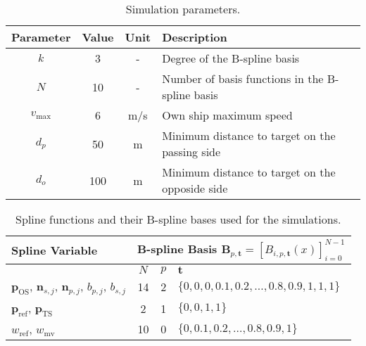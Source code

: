 \renewcommand{\arraystretch}{1.2}
\begin{table}[htbp]
    \centering
    \caption{Simulation parameters.}
    \label{tab:simulation-parameters}
    \begin{tabular}{|c|c|c|p{7cm}|}
        \hline
        \textbf{Parameter} & \textbf{Value} & \textbf{Unit} & \textbf{Description} \\
        \hline
        \rule{0pt}{2.5ex}$k$ & 3 & - & Degree of the B-spline basis \\
        \hline
        \rule{0pt}{2.5ex}$N$ & 10 & - & Number of basis functions in the B-spline basis \\
        \hline
        \rule{0pt}{2.5ex}$v_\text{max}$ & 6 & m/s & Own ship maximum speed \\
        \hline
        \rule{0pt}{2.5ex}$d_p$ & 50 & m & Minimum distance to target on the passing side \\
        \hline
        \rule{0pt}{2.5ex}$d_o$ & 100 & m & Minimum distance to target on the opposide side \\
        \hline
    \end{tabular}
\end{table}
\renewcommand{\arraystretch}{1.0}

\renewcommand{\arraystretch}{1.2}
\begin{table}[htbp]
    \centering
    \caption{Spline functions and their B-spline bases used for the simulations.}\label{tab:sim-spline-basis}
    \begin{tabular}{|p{2.5cm}||c|c|l|}
        \hline
        \rule{0pt}{2.5ex}
        \textbf{Spline Variable} & \multicolumn{3}{c|}{\textbf{B-spline Basis} $\mathbf{B}_{p, \mathbf t} = [B_{i, p, \mathbf t}(x)]_{i=0}^{N-1}$} \\[0.4ex]
        \hline
        & $N$ & $p$ & $\mathbf{t}$ \\
        \hline
        \hline
        $\mathbf{p}_\text{OS}$, $\mathbf{n}_{s, j}$, $\mathbf{n}_{p, j}$, $b_{p,j}$, $b_{s,j}$ 
        & 14 & 2 & $\{0, 0, 0, 0.1, 0.2, \ldots, 0.8, 0.9, 1, 1, 1\}$ \\
        \hline
        $\mathbf{p}_\text{ref}$, $\mathbf{p}_\text{TS}$ & 2 & 1 & $\{0, 0, 1, 1\}$ \\
        \hline
        $w_\text{ref}$, $w_\text{mv}$ & 10 & 0 & $\{0, 0.1, 0.2, \ldots, 0.8, 0.9, 1\}$ \\
        \hline
    \end{tabular}
\end{table}
\renewcommand{\arraystretch}{1.0}


